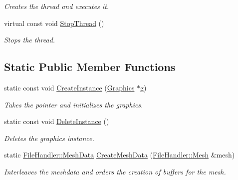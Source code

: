 \begin{DoxyCompactItemize}
\begin{DoxyCompactList}\small\item\em Creates the thread and executes it. \end{DoxyCompactList}\item 
virtual const void \hyperlink{class_ensum_1_1_graphics_1_1_graphics_a42ab0b6aa0d00eb926de5afef3ce1f9c}{Stop\+Thread} ()\hypertarget{class_ensum_1_1_graphics_1_1_graphics_a42ab0b6aa0d00eb926de5afef3ce1f9c}{}\label{class_ensum_1_1_graphics_1_1_graphics_a42ab0b6aa0d00eb926de5afef3ce1f9c}

\begin{DoxyCompactList}\small\item\em Stops the thread. \end{DoxyCompactList}\end{DoxyCompactItemize}
\subsection*{Static Public Member Functions}
\begin{DoxyCompactItemize}
\item 
static const void \hyperlink{class_ensum_1_1_graphics_1_1_graphics_a752ebdfc026c69ecc90f565e196ce726}{Create\+Instance} (\hyperlink{class_ensum_1_1_graphics_1_1_graphics}{Graphics} $\ast$g)
\begin{DoxyCompactList}\small\item\em Takes the pointer and initializes the graphics. \end{DoxyCompactList}\item 
static const void \hyperlink{class_ensum_1_1_graphics_1_1_graphics_a266c9b4cab940ccc392889be05d17d17}{Delete\+Instance} ()\hypertarget{class_ensum_1_1_graphics_1_1_graphics_a266c9b4cab940ccc392889be05d17d17}{}\label{class_ensum_1_1_graphics_1_1_graphics_a266c9b4cab940ccc392889be05d17d17}

\begin{DoxyCompactList}\small\item\em Deletes the graphics instance. \end{DoxyCompactList}\item 
static \hyperlink{struct_ensum_1_1_file_handler_1_1_mesh_data}{File\+Handler\+::\+Mesh\+Data} \hyperlink{class_ensum_1_1_graphics_1_1_graphics_acea2ccecffb6f21bd9d5ddb250879e07}{Create\+Mesh\+Data} (\hyperlink{class_ensum_1_1_file_handler_1_1_mesh}{File\+Handler\+::\+Mesh} \&mesh)\hypertarget{class_ensum_1_1_graphics_1_1_graphics_acea2ccecffb6f21bd9d5ddb250879e07}{}\label{class_ensum_1_1_graphics_1_1_graphics_acea2ccecffb6f21bd9d5ddb250879e07}

\begin{DoxyCompactList}\small\item\em Interleaves the meshdata and orders the creation of buffers for the mesh. \end{DoxyCompactList}\end{DoxyCompactItemize}
